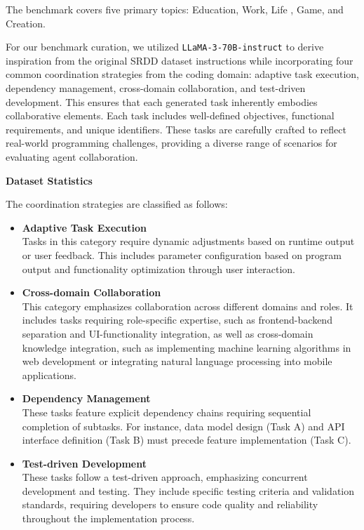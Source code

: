 The benchmark covers five primary topics: Education, Work, Life , Game, and Creation.

For our benchmark curation, we utilized \texttt{LLaMA-3-70B-instruct} to derive inspiration from the original SRDD dataset instructions while incorporating four common coordination strategies from the coding domain: adaptive task execution, dependency management, cross-domain collaboration, and test-driven development. This ensures that each generated task inherently embodies collaborative elements. Each task includes well-defined objectives, functional requirements, and unique identifiers. These tasks are carefully crafted to reflect real-world programming challenges, providing a diverse range of scenarios for evaluating agent collaboration. 

\textbf{Dataset Statistics}

The coordination strategies are classified as follows:

\begin{itemize}
    \item \textbf{Adaptive Task Execution}\\
    Tasks in this category require dynamic adjustments based on runtime output or user feedback. This includes parameter configuration based on program output and functionality optimization through user interaction.
    
    \item \textbf{Cross-domain Collaboration}\\
    This category emphasizes collaboration across different domains and roles. It includes tasks requiring role-specific expertise, such as frontend-backend separation and UI-functionality integration, as well as cross-domain knowledge integration, such as implementing machine learning algorithms in web development or integrating natural language processing into mobile applications.
    
    \item \textbf{Dependency Management}\\
    These tasks feature explicit dependency chains requiring sequential completion of subtasks. For instance, data model design (Task A) and API interface definition (Task B) must precede feature implementation (Task C).
    
    \item \textbf{Test-driven Development}\\
    These tasks follow a test-driven approach, emphasizing concurrent development and testing. They include specific testing criteria and validation standards, requiring developers to ensure code quality and reliability throughout the implementation process.
\end{itemize}




